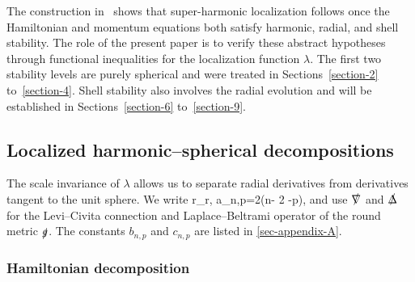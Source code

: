 \documentclass[11pt]{article}
\numberwithin{table}{section}
\numberwithin{equation}{section}
\numberwithin{table}{section}
\numberwithin{figure}{section}
\begin{document}
The construction in~\cite{LL-optimal-main} shows that super-harmonic localization follows once the Hamiltonian and momentum equations both satisfy harmonic, radial, and shell stability.  The role of the present paper is to verify these abstract hypotheses through functional inequalities for the localization function $\lambda$. The first two stability levels are purely spherical and were treated in Sections~\ref{section-2} to~\ref{section-4}.  Shell stability also involves the radial evolution and will be established in Sections~\ref{section-6} to~\ref{section-9}.


\subsection{Localized harmonic--spherical decompositions}
\label{sectionN2 -1}

The scale invariance of $\lambda$ allows us to separate radial derivatives from derivatives tangent to the unit sphere.  We write
\be
\vartheta\coloneqq r\del_r,
\qquad
a_{n,p}=2(n- 2 -p),
\ee
and use $\slashed\nabla{}$ and $\slashed\Delta{}$ for the Levi--Civita connection and Laplace--Beltrami operator of the round metric $\slashed{g}{}$.  The constants $b_{n,p}$ and $c_{n,p}$ are listed in \autoref{sec-appendix-A}.

\subsubsection{Hamiltonian decomposition}
\end{document}
